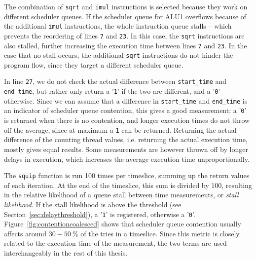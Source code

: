 \documentclass[11pt,
  titlepage=false,
  parskip=half,      %
]{scrreprt}
\begin{document}
The combination of \texttt{sqrt} and \texttt{imul} instructions is selected because they work on different scheduler queues.
If the scheduler queue for ALU1 overflows because of the additional \texttt{imul} instructions,
the whole instruction queue stalls -- which prevents the reordering of lines \texttt{7} and \texttt{23}.
In this case, the \texttt{sqrt} instructions are also stalled, further increasing the execution time between lines \texttt{7} and \texttt{23}.
In the case that no stall occurs, the additional \texttt{sqrt} instructions do not hinder the program flow,
since they target a different scheduler queue.

In line \texttt{27}, we do not check the actual difference between \texttt{start\_time} and \texttt{end\_time},
but rather only return a '\texttt{1}' if the two are different, and a '\texttt{0}' otherwise.
Since we can assume that a difference in \texttt{start\_time} and \texttt{end\_time} is an indicator of scheduler queue contention,
this gives a good measurement;
a '\texttt{0}' is returned when there is no contention, and longer execution times do not throw off the average,
since at maximum a \texttt{1} can be returned.
Returning the actual difference of the counting thread values, i.e. returning the actual execution time, mostly gives equal results.
Some measurements are however thrown off by longer delays in execution,
which increases the average execution time unproportionally.

The \texttt{squip} function is run 100 times per timeslice, summing up the return values of each iteration.
At the end of the timeslice, this sum is divided by 100,
resulting in the relative likelihood of a queue stall between time measurements, or \textit{stall likelihood}.
If the stall likelihood is above the threshold (see Section~\ref{sec:delaythreshold}), a '\texttt{1}' is registered, otherwise a '\texttt{0}'.
Figure~\ref{fig:contentioncoalesced} shows that scheduler queue contention usually affects around $30-50~\%$ of the tries in a timeslice.
Since this metric is closely related to the execution time of the measurement, the two terms are used interchangeably in the rest of this thesis.


\end{document}
